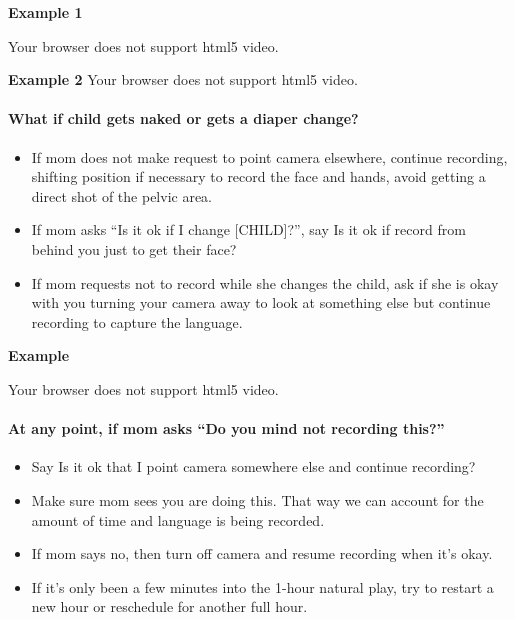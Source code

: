 \documentclass[
  12pt,
]{book}
\providecommand{\tightlist}{%
  \setlength{\itemsep}{0pt}\setlength{\parskip}{0pt}}
\begin{document}
\textbf{Example 1}

Your browser does not support html5 video.

\textbf{Example 2}
Your browser does not support html5 video.

\hypertarget{what-if-child-gets-naked-or-gets-a-diaper-change}{%
\paragraph*{What if child gets naked or gets a diaper change?}\label{what-if-child-gets-naked-or-gets-a-diaper-change}}

\begin{itemize}
\tightlist
\item
  If mom does not make request to point camera elsewhere, continue recording, shifting position if necessary to record the face and hands, avoid getting a direct shot of the pelvic area.
\item
  If mom asks ``Is it ok if I change {[}CHILD{]}?'', say Is it ok if record from behind you just to get their face?
\item
  If mom requests not to record while she changes the child, ask if she is okay with you turning your camera away to look at something else but continue recording to capture the language.
\end{itemize}

\textbf{Example}

Your browser does not support html5 video.

\hypertarget{at-any-point-if-mom-asks-do-you-mind-not-recording-this}{%
\paragraph*{At any point, if mom asks ``Do you mind not recording this?''}\label{at-any-point-if-mom-asks-do-you-mind-not-recording-this}}

\begin{itemize}
\tightlist
\item
  Say Is it ok that I point camera somewhere else and continue recording?\\
\item
  Make sure mom sees you are doing this. That way we can account for the amount of time and language is being recorded.
\item
  If mom says no, then turn off camera and resume recording when it's okay.
\item
  If it's only been a few minutes into the 1-hour natural play, try to restart a new hour or reschedule for another full hour.
\end{itemize}
\end{document}
